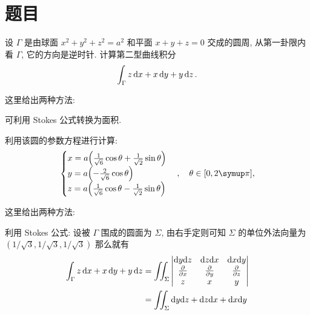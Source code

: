 \section{题目}

\startexercise
\begin{exercise}[series=exer]
  \item 设 $ \Gamma $ 是由球面 $ x^{2} + y^{2} + z^{2} = a^{2} $ 和平面 $ x + y + z = 0 $ 交成的圆周, 从第一卦限内看 $ \Gamma $, 它的方向是逆时针. 计算第二型曲线积分
  \begin{align*}
    \int_{\Gamma} z \dx* + x \dd{y} + y \dd{z}.
  \end{align*}
  \begin{hint}
    这里给出两种方法:
    \begin{method}
      \item 可利用 Stokes 公式转换为面积.
      \item 利用该圆的参数方程进行计算:
        \begin{align*}
          \begin{cases}
            x = a\qty(\frac{1}{\sqrt{6}}\cos \theta + \frac{1}{\sqrt{2}}\sin \theta)\\
            y = a\qty(-\frac{2}{\sqrt{6}}\cos \theta)\\
            z = a\qty(\frac{1}{\sqrt{6}}\cos \theta - \frac{1}{\sqrt{2}}\sin \theta)
          \end{cases}, \quad \theta\in [0, 2\pi],
        \end{align*}
    \end{method}
  \end{hint}
  \begin{answer}
    这里给出两种方法:
    \begin{method}
      \item 利用 Stokes 公式: 设被 $ \Gamma $ 围成的圆面为 $ \Sigma $, 由右手定则可知 $ \Sigma $ 的单位外法向量为 $ (1/\sqrt{3}, 1/\sqrt{3}, 1/\sqrt{3}) $ 那么就有
        \begin{align*}
          \int_{\Gamma} z \dx* + x \dd{y} + y \dd{z}
          & = \iint_{\Sigma}
            \begin{vmatrix}
              \dy\dz  & \dz\dx    & \dx\dy \\
              \pdv{x} & \pdv{y}   & \pdv{z} \\
              z       & x         & y
            \end{vmatrix} \\
          & = \iint_{\Sigma} \dy\dz + \dz\dx + \dx\dy \\

\end{align*}
\end{method}
\end{answer}
\end{exercise}
